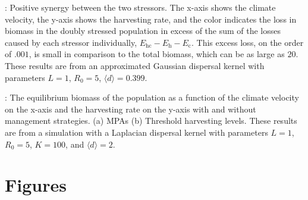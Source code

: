 \documentclass[12pt,english]{article}
\begin{document}
\begin{spacing}{1.9}
: Positive synergy between the two stressors.  The x-axis shows the climate velocity, the y-axis shows the harvesting rate, and the color indicates the loss in biomass in the doubly stressed population in excess of the sum of the losses caused by each stressor individually, $E_\text{hc}-E_\text{h}-E_\text{c}$.  This excess loss, on the order of $.001$, is small in comparison to the total biomass, which can be as large as $20$.  These results are from an approximated Gaussian dispersal kernel with parameters $L=1$, $R_0=5$, $\langle d \rangle = 0.399$.
\hspace{6in}

\hspace{6in}

: The equilibrium biomass of the population as a function of the climate velocity on the x-axis and the harvesting rate on the y-axis with and without management strategies.  (a) MPAs (b) Threshold harvesting levels.  These results are from a simulation with a Laplacian dispersal kernel with parameters $L=1$, $R_0=5$, $K=100$, and $\langle d \rangle =2$.
\pagebreak

\section{Figures}


\end{spacing}
\end{document}
